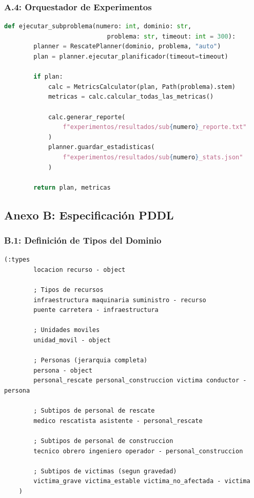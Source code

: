 \documentclass[conference]{IEEEtran}
\begin{document}
    \subsubsection*{A.4: Orquestador de Experimentos}

    \begin{lstlisting}[style=anexostyle,language=Python,caption={Función para ejecutar sub-problemas}]
    def ejecutar_subproblema(numero: int, dominio: str, 
                            problema: str, timeout: int = 300):
        planner = RescatePlanner(dominio, problema, "auto")
        plan = planner.ejecutar_planificador(timeout=timeout)
        
        if plan:
            calc = MetricsCalculator(plan, Path(problema).stem)
            metricas = calc.calcular_todas_las_metricas()
            
            calc.generar_reporte(
                f"experimentos/resultados/sub{numero}_reporte.txt"
            )
            planner.guardar_estadisticas(
                f"experimentos/resultados/sub{numero}_stats.json"
            )
        
        return plan, metricas
    \end{lstlisting}

    \subsection*{Anexo B: Especificación PDDL}

    \subsubsection*{B.1: Definición de Tipos del Dominio}

    \begin{lstlisting}[style=anexostyle,caption={Jerarquía de tipos PDDL del dominio}]
    (:types 
        locacion recurso - object
        
        ; Tipos de recursos
        infraestructura maquinaria suministro - recurso
        puente carretera - infraestructura
        
        ; Unidades moviles
        unidad_movil - object
        
        ; Personas (jerarquia completa)
        persona - object
        personal_rescate personal_construccion victima conductor - persona
        
        ; Subtipos de personal de rescate
        medico rescatista asistente - personal_rescate
        
        ; Subtipos de personal de construccion  
        tecnico obrero ingeniero operador - personal_construccion
        
        ; Subtipos de victimas (segun gravedad)
        victima_grave victima_estable victima_no_afectada - victima
    )
    \end{lstlisting}
\end{document}
